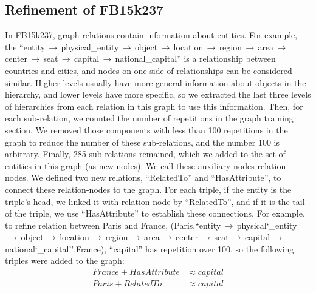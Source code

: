 \documentclass{article} \usepackage{iclr2022_conference,times}
\begin{document}
\subsection{Refinement of FB15k237}
In FB15k237, graph relations contain information about entities. For example, the ``entity$\,\to\,$physical\_entity$\,\to\,$object$\,\to\,$location$\,\to\,$region$\,\to\,$area$\,\to\,$center$\,\to\,$seat$\,\to\,$capital$\,\to\,$national\_capital'' is a relationship between countries and cities, and nodes on one side of relationships can be considered similar. Higher levels usually have more general information about objects in the hierarchy, and lower levels have more specific, so we extracted the last three levels of hierarchies from each relation in this graph to use this information. Then, for each sub-relation, we counted the number of repetitions in the graph training section. We removed those components with less than 100 repetitions in the graph to reduce the number of these sub-relations, and the number 100 is arbitrary. Finally, 285 sub-relations remained, which we added to the set of entities in this graph (as new nodes). We call these auxiliary nodes relation-nodes. We defined two new relations, ``RelatedTo'' and ``HasAttribute'', to connect these relation-nodes to the graph. For each triple, if the entity is the triple's head, we linked it with relation-node by ``RelatedTo'', and if it is the tail of the triple, we use ``HasAttribute'' to establish these connections. For example, to refine relation between Paris and France, (Paris,``entity$\,\to\,$physical\char`_entity$\,\to\,$object$\,\to\,$location$\,\to\,$region$\,\to\,$area$\,\to\,$center$\,\to\,$seat$\,\to\,$capital$\,\to\,$national\char`_capital'',France), ``capital'' has repetition over 100, so the following triples were added to the graph:
\begin{align*}
	France + HasAttribute &\approx capital \\
	Paris + RelatedTo &\approx capital 	
\end{align*}
\end{document}
